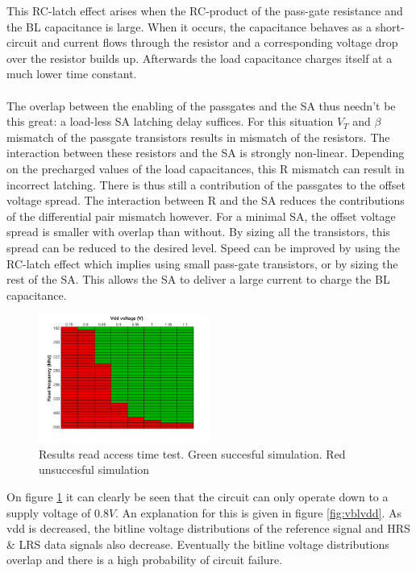 \documentclass[journal]{IEEEtran}
\begin{document}
This RC-latch effect arises when the RC-product of the pass-gate resistance and the BL capacitance is large. When it occurs, the capacitance behaves as a short-circuit and current flows through the resistor and a corresponding voltage drop over the resistor builds up. Afterwards the load capacitance charges itself at a much lower time constant.\\\\
The overlap between the enabling of the passgates and the SA thus needn't be this great: a load-less SA latching delay suffices. For this situation $V_{T}$ and $\beta$ mismatch of the passgate transistors results in mismatch of the resistors. The interaction between these resistors and the SA is strongly non-linear. Depending on the precharged values of the load capacitances, this R mismatch can result in incorrect latching. There is thus still a contribution of the passgates to the offset voltage spread. The interaction between R and the SA reduces the contributions of the differential pair mismatch however. For a minimal SA, the offset voltage spread is smaller with overlap than without. By sizing all the transistors, this spread can be reduced to the desired level. Speed can be improved by using the RC-latch effect which implies using small pass-gate transistors, or by sizing the rest of the SA. This allows the SA to deliver a large current to charge the BL capacitance.

\begin{figure}[h!t]
  \centering
  \includegraphics[width=0.5\textwidth]{../fig/hfdst-final-vddspeed.png}
  \caption{Results read access time test. Green succesful simulation. Red unsuccesful simulation}
  \label{fig:speedvdd}
\end{figure}

On figure \ref{fig:speedvdd} it can clearly be seen that the circuit can only operate down to a supply voltage of $0.8V$. An explanation for this is given in figure \ref{fig:vblvdd}. As vdd is decreased, the bitline voltage distributions of the reference signal and HRS \& LRS data signals also decrease. Eventually the bitline voltage distributions overlap and there is a high probability of circuit failure.
\end{document}
